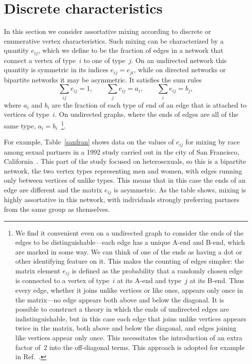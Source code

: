 \documentclass[twocolumn,pre]{revtex4}
\begin{document}
\section{Discrete characteristics}
\label{discrete}
In this section we consider assortative mixing according to discrete or
enumerative vertex characteristics.  Such mixing can be characterized by a
quantity $e_{ij}$, which we define to be the fraction of edges in a network
that connect a vertex of type~$i$ to one of type~$j$.  On an undirected
network this quantity is symmetric in its indices $e_{ij}=e_{ji}$, while on
directed networks or bipartite networks it may be asymmetric.  It satisfies
the sum rules
\begin{equation}
\sum_{ij} e_{ij} = 1,\qquad \sum_j e_{ij} = a_i,\qquad \sum_i e_{ij} = b_j,
\label{sumrules}
\end{equation}
where $a_i$ and $b_i$ are the fraction of each type of end of an edge that
is attached to vertices of type~$i$.  On undirected graphs, where the ends
of edges are all of the same type, $a_i=b_i$~\footnote{We find it
convenient even on a undirected graph to consider the ends of the edges to
be distinguishable---each edge has a unique A-end and B-end, which are
marked in some way.  We can think of one of the ends as having a dot or
other identifying feature on it.  This makes the counting of edges simpler:
the matrix element $e_{ij}$ is defined as the probability that a randomly
chosen edge is connected to a vertex of type~$i$ at its A-end and type~$j$
at its B-end.  Thus every edge, whether it joins unlike vertices or like
ones, appears only once in the matrix---no edge appears both above and
below the diagonal.  It is possible to construct a theory in which the ends
of undirected edges are indistinguishable, but in this case each edge that
joins unlike vertices appears twice in the matrix, both above and below the
diagonal, and edges joining like vertices appear only once.  This
necessitates the introduction of an extra factor of~2 into the off-diagonal
terms.  This approach is adopted for example in Ref.~.}.

For example, Table~\ref{sanfran} shows data on the values of $e_{ij}$ for
mixing by race among sexual partners in a 1992 study carried out in the
city of San Francisco, California~\cite{CCKF92}.  This part of the study
focused on heterosexuals, so this is a bipartite network, the two vertex
types representing men and women, with edges running only between vertices
of unlike types.  This means that in this case the ends of an edge are
different and the matrix $e_{ij}$ is asymmetric.  As the table shows,
mixing is highly assortative in this network, with individuals strongly
preferring partners from the same group as themselves.
\end{document}
